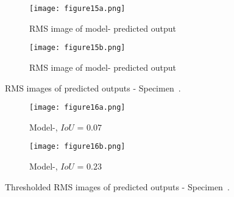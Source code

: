 \begin{figure} [!h]
	\begin{subfigure}[b]{.49\textwidth}
		\centering
		\texttt{[image: figure15a.png]}
		\caption{RMS image of model- predicted output}
		\label{fig:RMS_L3_S4_B_saeed}
	\end{subfigure}
	\hfill
	\begin{subfigure}[b]{.49\textwidth}
		\centering
		\texttt{[image: figure15b.png]}
		\caption{RMS image of model- predicted output} 
		\label{fig:RMS_L3_S4_B_ijjeh}
	\end{subfigure}
	\caption{RMS images of predicted outputs - Specimen~.}
	\label{fig:RMS_L3_S4_B__images}
\end{figure} 
\begin{figure} [!h]
	\begin{subfigure}[b]{.49\textwidth}
		\centering
		\texttt{[image: figure16a.png]}
		\caption{Model-, \(IoU\) = \(0.07\)}
		\label{fig:RMS_threshold_L3_S4_B_saeed}
	\end{subfigure}
	\hfill
	\begin{subfigure}[b]{.49\textwidth}
		\centering
		\texttt{[image: figure16b.png]}
		\caption{Model-, \(IoU\) = \(0.23\)} 
		\label{fig:RMS_threshold_L3_S4_B_ijjeh}
	\end{subfigure}
	\caption{Thresholded RMS images of predicted outputs - Specimen~.}
	\label{fig:RMS_threshold_L3_S4_B__images}
\end{figure} 
